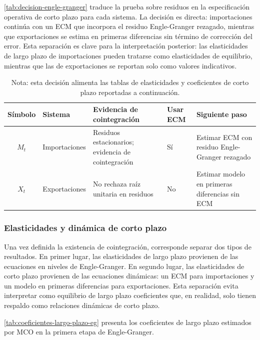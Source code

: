 \documentclass[11pt,a4paper]{article}
\begin{document}
	\autoref{tab:decision-engle-granger} traduce la prueba sobre residuos en la
	especificación operativa de corto plazo para cada sistema. La decisión es
	directa: importaciones continúa con un ECM que incorpora el residuo
	Engle-Granger rezagado, mientras que exportaciones se estima en primeras
	diferencias sin término de corrección del error. Esta separación es clave para
	la interpretación posterior: las elasticidades de largo plazo de importaciones
	pueden tratarse como elasticidades de equilibrio, mientras que las de
	exportaciones se reportan solo como valores indicativos.
	
	\begin{table}[H]
		\centering
		\caption{Decisión operativa Engle-Granger.}
		\label{tab:decision-engle-granger}
		\small
		\begin{tabular}{clp{4.0cm}lp{4.3cm}}
			\toprule
			Símbolo & Sistema & Evidencia de cointegración & Usar ECM & Siguiente paso \\
			\midrule
			\(M_t\) & Importaciones &
			Residuos estacionarios; evidencia de cointegración &
			Sí &
			Estimar ECM con residuo Engle-Granger rezagado \\
			\(X_t\) & Exportaciones &
			No rechaza raíz unitaria en residuos &
			No &
			Estimar modelo en primeras diferencias sin ECM \\
			\bottomrule
		\end{tabular}
		\caption*{\footnotesize Nota: esta decisión alimenta las tablas de
			elasticidades y coeficientes de corto plazo reportadas a continuación.}
	\end{table}
	
	\subsubsection{Elasticidades y dinámica de corto plazo}
	\label{subsubsec:eg-elasticidades-corto-plazo}
	
	Una vez definida la existencia de cointegración, corresponde separar dos tipos
	de resultados. En primer lugar, las elasticidades de largo plazo provienen de
	las ecuaciones en niveles de Engle-Granger. En segundo lugar, las elasticidades
	de corto plazo provienen de las ecuaciones dinámicas: un ECM para importaciones
	y un modelo en primeras diferencias para exportaciones. Esta separación evita
	interpretar como equilibrio de largo plazo coeficientes que, en realidad, solo
	tienen respaldo como relaciones dinámicas de corto plazo.
	
	\autoref{tab:coeficientes-largo-plazo-eg} presenta los coeficientes de largo
	plazo estimados por MCO en la primera etapa de Engle-Granger.
	
\end{document}

